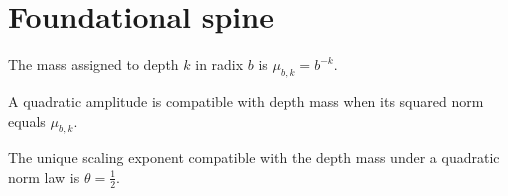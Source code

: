 
\section{Foundational spine}

\begin{definition}
  \label{def:depth-mass}
  The mass assigned to depth $k$ in radix $b$ is $\mu_{b,k}=b^{-k}$.
\end{definition}

\begin{definition}
  \label{def:quadratic-amplitude}
  A quadratic amplitude is compatible with depth mass when its squared norm equals $\mu_{b,k}$.
\end{definition}

\begin{theorem}
  \label{thm:FND-007}
  The unique scaling exponent compatible with the depth mass under a quadratic norm law is $\theta=\frac12$.
\end{theorem}
